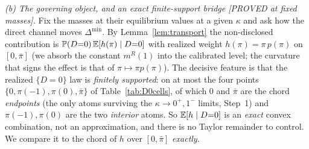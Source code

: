 \begin{remark}
\emph{(b) The governing object, and an exact finite-support bridge
\textnormal{[PROVED at fixed masses]}.}
Fix the masses at their equilibrium values at a given $\kappa$ and ask how the
direct channel moves $\Delta^{\min}$. By Lemma~\ref{lem:transport} the non-disclosed
contribution is $\mathbb{P}(D{=}0)\,\mathbb{E}[h(\pi)\mid D{=}0]$ with realized weight
$h(\pi)=\pi\,p(\pi)$ on $[0,\bar\pi]$ (we absorb the constant $m^R(1)$ into the
calibrated level; the curvature that signs the effect is that of $\pi\mapsto\pi
p(\pi)$). The decisive feature is that the realized $\{D=0\}$ law is \emph{finitely
supported}: on at most the four points $\{0,\pi(-1),\pi(0),\bar\pi\}$ of
Table~\ref{tab:D0cells}, of which $0$ and $\bar\pi$ are the chord \emph{endpoints}
(the only atoms surviving the $\kappa\to0^+,1^-$ limits, Step~1) and $\pi(-1),\pi(0)$
are the two \emph{interior} atoms. So $\mathbb{E}[h\mid D{=}0]$ is an \emph{exact} convex
combination, not an approximation, and there is no Taylor remainder to control. We
compare it to the chord of $h$ over $[0,\bar\pi]$ \emph{exactly}.


\end{remark}
